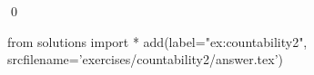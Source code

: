 
\begin{ex} 
  \label{ex:countability2}
  
  \qed
\end{ex} 
\begin{python0}
from solutions import *
add(label="ex:countability2",
    srcfilename='exercises/countability2/answer.tex') 
\end{python0}
